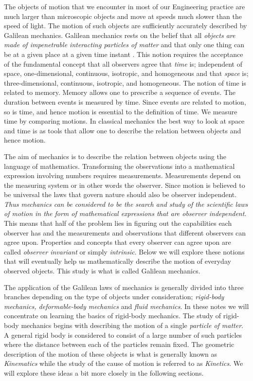 \documentclass[graybox,envcountchap,sectrefs]{svmonoMuga}
\begin{document}
The objects of motion that we encounter in most of our Engineering practice are much larger than microscopic objects and move at speeds much slower than the 
speed of light. The motion of such objects are sufficiently accurately described by Galilean mechanics. Galilean mechanics rests on the 
belief that all \textit{objects are made of 
impenetrable interacting particles of matter} and that only one thing can be at a given place at a given time instant \cite{MM}. This notion requires the acceptance of the fundamental concept that all observers agree that \textit{time} is; independent of space, one-dimensional, continuous, isotropic, and homogeneous and that
\textit{space} is; three-dimensional, continuous, isotropic, and homogeneous. 
The notion of time is related to memory. Memory allows one to prescribe a sequence of 
events. The duration between events is measured by time. Since events are related to motion, so is time, and hence motion is essential to the definition of time. We measure time by comparing motions. In classical mechanics the 
best way to look at space and time is as tools that allow one to describe the relation between objects and hence motion. 

The aim of mechanics is to describe the relation between objects using the language of mathematics. Transforming the observations into a mathematical expression involving numbers requires measurements. Measurements depend on the measuring system or in other words the observer. Since motion is believed to be universal the laws that govern nature should also be observer independent. \emph{Thus mechanics can be considered to be the search and study of the scientific laws of motion in the form of mathematical expressions that are observer independent}. This means that half of the problem lies in figuring out the capabilities each observer has and the measurements and observations that different observers can agree upon. Properties and concepts that every observer can agree upon are called \textit{observer invariant} or simply \textit{intrinsic}. 
Below we will explore these notions that will eventually help us mathematically describe the motion of everyday observed objects. This study is what is called Galilean mechanics.


The application of the Galilean laws of mechanics is generally divided
into three branches depending on the type of objects under consideration; \textit{rigid-body mechanics, deformable-body mechanics} and \textit{fluid mechanics}. In these notes we 
will concentrate on learning the basics of rigid-body mechanics.
The study of rigid-body mechanics begins with describing the motion of a single \textit{particle of matter}. A general rigid body is considered to consist of a large number of such particles where the distance between each of the particles 
remain fixed. The geometric description of the motion of these objects is what is generally known as \textit{Kinematics} while the study of the cause of motion is referred to as 
\textit{Kinetics}. We will explore these ideas a bit more closely in the following sections.
\end{document}
